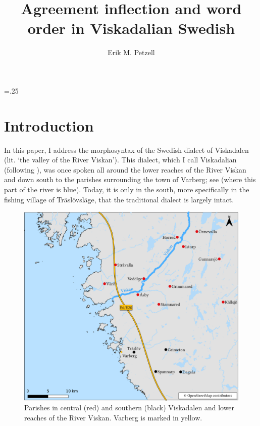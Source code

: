 \documentclass[output=paper,colorlinks,citecolor=brown,draft,draftmode]{langscibook}
\author{Erik M. Petzell\affiliation{Institute for Language and Folklore, Gothenburg}}
\title{Agreement inflection and word order in Viskadalian Swedish}
\begin{document}
\multicolsep=.25\baselineskip
\maketitle


\section{Introduction}\label{sec:petzell:1}


In this paper, I address the morphosyntax of the Swedish dialect of Viskadalen (lit. ‘the valley of the River Viskan’). This dialect, which I call Viskadalian (following \citealt{Petzell2017}), was once spoken all around the lower reaches of the River Viskan and down south to the parishes surrounding the town of Varberg; see  (where this part of the river is blue). Today, it is only in the south, more specifically in the fishing village of Träslövsläge, that the traditional dialect is largely intact. 

\begin{figure}
\includegraphics[width=\textwidth]{figures/lmswe-latest-compressed.pdf}
\caption{\label{figmap:petzell:1}\label{figmap:petzell:2}Parishes in central (red) and southern (black) Viskadalen and lower reaches of the River Viskan. Varberg is marked in yellow.}
\end{figure}
\end{document}
